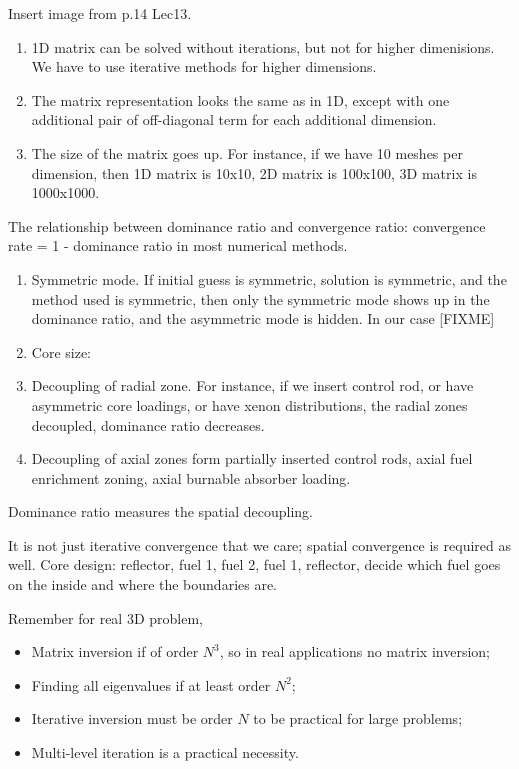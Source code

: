 \documentclass{school-22.211-notes}
\begin{document}
\clearpage
{}
Insert image from p.14 Lec13. 

\begin{enumerate}
\item 1D matrix can be solved without iterations, but not for higher dimenisions. We have to use iterative methods for higher dimensions. 
\item The matrix representation looks the same as in 1D, except with one additional pair of off-diagonal term for each additional dimension. 
\item The size of the matrix goes up. For instance, if we have 10 meshes per dimension, then 1D matrix is 10x10, 2D matrix is 100x100, 3D matrix is 1000x1000.
\end{enumerate}


\clearpage
{}
The relationship between dominance ratio and convergence ratio: convergence rate = 1 - dominance ratio in most numerical methods. 
\begin{enumerate}
\item Symmetric mode. If initial guess is symmetric, solution is symmetric, and the method used is symmetric, then only the symmetric mode shows up in the dominance ratio, and the asymmetric mode is hidden. In our case  [FIXME]

\item Core size: 

\item Decoupling of radial zone. For instance, if we insert control rod, or have asymmetric core loadings, or have xenon distributions,  the radial zones decoupled, dominance ratio decreases. 

\item Decoupling of axial zones form partially inserted control rods, axial fuel enrichment zoning, axial burnable absorber loading. 
\end{enumerate}
Dominance ratio measures the spatial decoupling. 

It is not just iterative convergence that we care; spatial convergence is required as well. Core design: reflector, fuel 1, fuel 2, fuel 1, reflector, decide which fuel goes on the inside and where the boundaries are. 


\clearpage
{}
Remember for real 3D problem,
\begin{itemize}
\item Matrix inversion if of order $N^3$, so in real applications no matrix inversion;
\item Finding all eigenvalues if at least order $N^2$;
\item Iterative inversion must be order $N$ to be practical for large problems;
\item Multi-level iteration is a practical necessity. 
\end{itemize}
\end{document}
